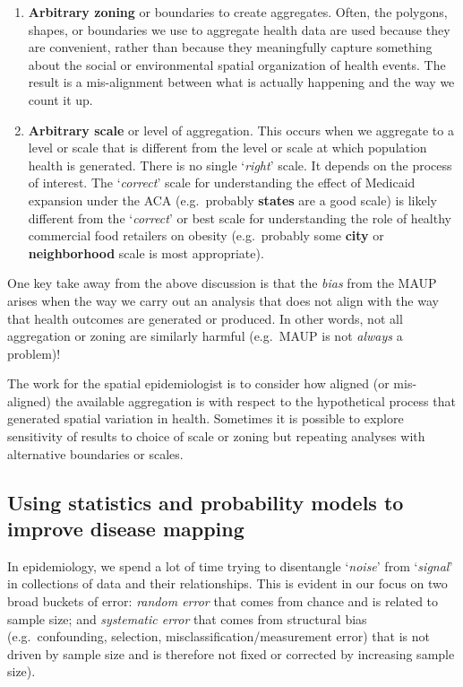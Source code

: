 \documentclass[
]{book}
\providecommand{\tightlist}{%
  \setlength{\itemsep}{0pt}\setlength{\parskip}{0pt}}
\begin{document}
\begin{enumerate}
\def\labelenumi{\arabic{enumi}.}
\tightlist
\item
  \textbf{Arbitrary zoning} or boundaries to create aggregates. Often, the polygons, shapes, or boundaries we use to aggregate health data are used because they are convenient, rather than because they meaningfully capture something about the social or environmental spatial organization of health events. The result is a mis-alignment between what is actually happening and the way we count it up.
\item
  \textbf{Arbitrary scale} or level of aggregation. This occurs when we aggregate to a level or scale that is different from the level or scale at which population health is generated. There is no single `\emph{right}' scale. It depends on the process of interest. The `\emph{correct}' scale for understanding the effect of Medicaid expansion under the ACA (e.g.~probably \textbf{states} are a good scale) is likely different from the `\emph{correct}' or best scale for understanding the role of healthy commercial food retailers on obesity (e.g.~probably some \textbf{city} or \textbf{neighborhood} scale is most appropriate).
\end{enumerate}

One key take away from the above discussion is that the \emph{bias} from the MAUP arises when the way we carry out an analysis that does not align with the way that health outcomes are generated or produced. In other words, not all aggregation or zoning are similarly harmful (e.g.~MAUP is not \emph{always} a problem)!

The work for the spatial epidemiologist is to consider how aligned (or mis-aligned) the available aggregation is with respect to the hypothetical process that generated spatial variation in health. Sometimes it is possible to explore sensitivity of results to choice of scale or zoning but repeating analyses with alternative boundaries or scales.

\hypertarget{using-statistics-and-probability-models-to-improve-disease-mapping}{%
\subsection{Using statistics and probability models to improve disease mapping}\label{using-statistics-and-probability-models-to-improve-disease-mapping}}

In epidemiology, we spend a lot of time trying to disentangle `\emph{noise}' from `\emph{signal}' in collections of data and their relationships. This is evident in our focus on two broad buckets of error: \emph{random error} that comes from chance and is related to sample size; and \emph{systematic error} that comes from structural bias (e.g.~confounding, selection, misclassification/measurement error) that is not driven by sample size and is therefore not fixed or corrected by increasing sample size).
\end{document}
